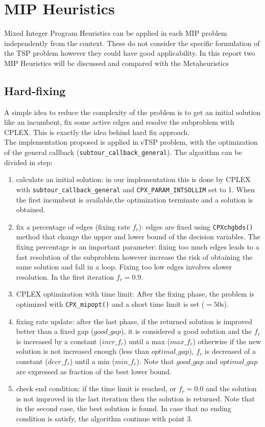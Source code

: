 \chapter{MIP Heuristics}
Mixed Integer Program Heuristics can be applied in each MIP problem independently from the context. These do not consider the specific formulation of the TSP problem however they could have good applicability. In this report two MIP Heuristics will be discussed and compared with the  Metaheuristics

\section{Hard-fixing}
A simple idea to reduce the complexity of the problem is to get an initial solution like an incumbent, fix some active edges and resolve the subproblem with CPLEX. This is exactly the idea behind hard fix approach.\\
The implementation proposed is applied in sTSP problem, with the optimization of the general callback (\texttt{subtour\_callback\_general}).
The algorithm can be divided in step:
\begin{enumerate}
	\item calculate an initial solution: in our implementation this is done by CPLEX with \texttt{subtour\_callback\_general} and \texttt{CPX\_PARAM\_INTSOLLIM} set to 1. When the first incumbent is available,the optimization terminate and a solution is obtained.
	\item fix a percentage of edges (fixing rate $ f_r $): edges are fixed using \texttt{CPXchgbds()} method that change the upper and lower bound of the decision variables. The fixing percentage is an important parameter: fixing too much edges leads to a fast resolution of the subproblem however increase the risk of obtaining the same solution and fall in a loop. Fixing too low edges involves slower resolution. In the first iteration $ f_r = 0.9 $.
	\item CPLEX optimization with time limit: After the fixing phase, the problem is optimized with \texttt{CPX\_mipopt()} and a short time limit is set ($ = 50 $s).
	\item fixing rate update: after the last phase, if the returned solution is improved better than a fixed gap ($  good\_gap $), it is considered a good solution and the $ f_r $ is increased by a constant ($ incr\_f_r $) until a max ($ max\_f_r $) otherwise if the new solution is not increased enough (less than $ optimal\_gap $), $ f_r $ is decreased of a constant ($ decr\_f_r $) until a min ($ min\_f_r $). Note that $ good\_gap $ and $ optimal\_gap $ are expressed as fraction of the best lower bound.
	\item check end condition: if the time limit is reached, or $ f_r = 0.0 $ and the solution is not improved in the last iteration then the solution is returned. Note that in the second case, the best solution is found. In case that no ending condition is satisfy, the algorithm continue with point 3.
\end{enumerate}

